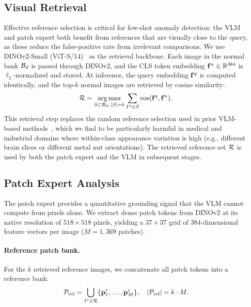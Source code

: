 \subsection{Visual Retrieval}
\label{sec:retrieval}

Effective reference selection is critical for few-shot anomaly detection: the VLM and patch expert both benefit from references that are visually close to the query, as these reduce the false-positive rate from irrelevant comparisons.
We use DINOv2-Small (ViT-S/14)~\citep{oquab2024dinov2} as the retrieval backbone.
Each image in the normal bank $\mathcal{B}_d$ is passed through DINOv2, and the CLS token embedding $\mathbf{f}^n \in \mathbb{R}^{384}$ is $\ell_2$-normalized and stored.
At inference, the query embedding $\mathbf{f}^q$ is computed identically, and the top-$k$ normal images are retrieved by cosine similarity:
\begin{equation}
    \mathcal{R} = \underset{S \subset \mathcal{B}_d,\, |S|=k}{\operatorname*{arg\,max}} \sum_{I^n \in S} \cos(\mathbf{f}^q, \mathbf{f}^n).
    \label{eq:retrieval}
\end{equation}
This retrieval step replaces the random reference selection used in prior VLM-based methods~\citep{jiang2024mmad,zhang2025agentiad}, which we find to be particularly harmful in medical and industrial domains where within-class appearance variation is high (e.g., different brain slices or different metal nut orientations).
The retrieved reference set $\mathcal{R}$ is used by both the patch expert and the VLM in subsequent stages.

\subsection{Patch Expert Analysis}
\label{sec:expert}

The patch expert provides a quantitative grounding signal that the VLM cannot compute from pixels alone.
We extract dense patch tokens from DINOv2 at its native resolution of $518 \times 518$ pixels, yielding a $37 \times 37$ grid of $384$-dimensional feature vectors per image ($M = 1{,}369$ patches).

\paragraph{Reference patch bank.}
For the $k$ retrieved reference images, we concatenate all patch tokens into a reference bank:
\begin{equation}
    \mathcal{P}_{\text{ref}} = \bigcup_{I^r \in \mathcal{R}} \{\mathbf{p}^r_1, \ldots, \mathbf{p}^r_M\}, \quad |\mathcal{P}_{\text{ref}}| = k \cdot M.
    \label{eq:patchbank}
\end{equation}

